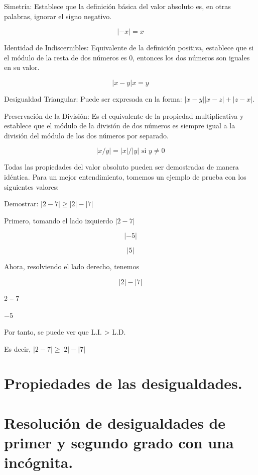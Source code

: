 \documentclass[oneside,spanish,letterpaper]{extbook}
\theoremstyle{mythmstyle}
\begin{document}
Simetría: Establece que la definición básica del valor absoluto es, en otras palabras, ignorar
el signo negativo.

$$| - x | = x$$

Identidad de Indiscernibles: Equivalente de la definición positiva, establece que si el módulo
de la resta de dos números es 0, entonces los dos números son iguales en su valor.

$$| x - y | x = y$$

Desigualdad Triangular: Puede ser expresada en la forma: $| x - y | | x - z | + | z - x |$.

Preservación de la División: Es el equivalente de la propiedad multiplicativa y establece que
el módulo de la división de dos números es siempre igual a la división del módulo de los dos
números por separado.

$$| x / y| = | x | / | y | \text{ si }y\neq 0$$




Todas las propiedades del valor absoluto pueden ser demostradas de manera idéntica.
Para un mejor entendimiento, tomemos un ejemplo de prueba con los siguientes valores:

Demostrar: $| 2 - 7 | \geqslant | 2 | - | 7 |$

Primero, tomando el lado izquierdo $| 2 - 7 |$

  $$| - 5 |$$

  $$| 5 |$$

Ahora, resolviendo el lado derecho, tenemos

$$| 2 | - | 7 |$$

  2 – 7

  $-5$

Por tanto, se puede ver que L.I. > L.D.

Es decir, $| 2 - 7| \geqslant | 2 | - | 7 |$ \cite{cd5}

\section{Propiedades de las desigualdades.}
\section{Resolución de desigualdades de primer y segundo grado con una incógnita.}
 
\end{document}

